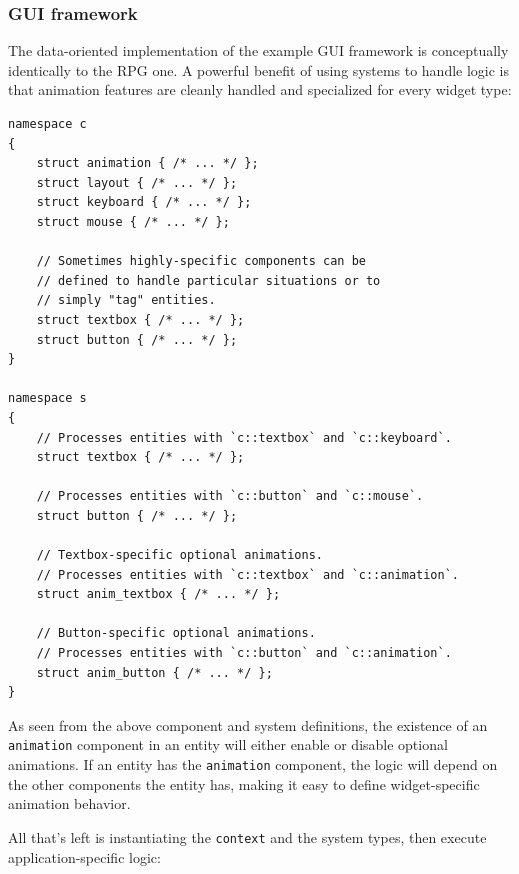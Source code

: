 \documentclass[twoside, 12pt, a4paper, openany]{book}
\begin{document}
\subsubsection{GUI framework}\label{gui-framework-3}

The data-oriented implementation of the example GUI framework is
conceptually identically to the RPG one. A powerful benefit of using
systems to handle logic is that animation features are cleanly handled
and specialized for every widget type:

\begin{verbatim}
namespace c
{
    struct animation { /* ... */ };
    struct layout { /* ... */ };
    struct keyboard { /* ... */ };
    struct mouse { /* ... */ };

    // Sometimes highly-specific components can be
    // defined to handle particular situations or to
    // simply "tag" entities.
    struct textbox { /* ... */ };
    struct button { /* ... */ };
}

namespace s
{
    // Processes entities with `c::textbox` and `c::keyboard`.
    struct textbox { /* ... */ };

    // Processes entities with `c::button` and `c::mouse`.
    struct button { /* ... */ };

    // Textbox-specific optional animations.
    // Processes entities with `c::textbox` and `c::animation`.
    struct anim_textbox { /* ... */ };

    // Button-specific optional animations.
    // Processes entities with `c::button` and `c::animation`.
    struct anim_button { /* ... */ };
}
\end{verbatim}

As seen from the above component and system definitions, the existence
of an
\texttt{animation}
component in an entity will either enable or disable optional
animations. If an entity has the
\texttt{animation}
component, the logic will depend on the other components the entity has,
making it easy to define widget-specific animation behavior.

All that's left is instantiating the
\texttt{context}
and the system types, then execute application-specific logic:
\end{document}
